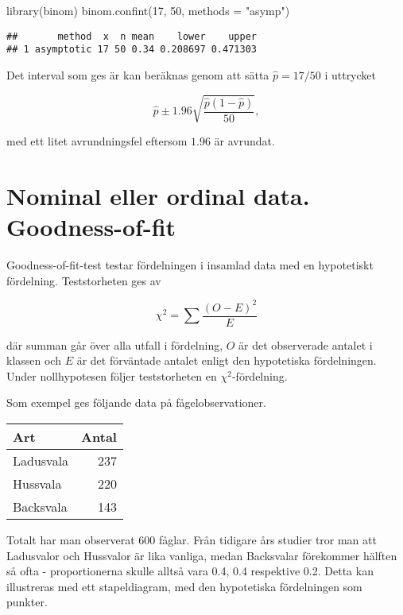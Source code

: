 \documentclass[
]{book}
\newenvironment{Shaded}{\begin{snugshade}}{\end{snugshade}}
\newcommand{\AttributeTok}[1]{\textcolor[rgb]{0.77,0.63,0.00}{#1}}
\newcommand{\DecValTok}[1]{\textcolor[rgb]{0.00,0.00,0.81}{#1}}
\newcommand{\FunctionTok}[1]{\textcolor[rgb]{0.00,0.00,0.00}{#1}}
\newcommand{\NormalTok}[1]{#1}
\newcommand{\StringTok}[1]{\textcolor[rgb]{0.31,0.60,0.02}{#1}}
\theoremstyle{definition}
\theoremstyle{definition}
\theoremstyle{definition}
\theoremstyle{definition}
\theoremstyle{remark}
\begin{document}
\begin{Shaded}
\begin{Highlighting}[]
\FunctionTok{library}\NormalTok{(binom)}
\FunctionTok{binom.confint}\NormalTok{(}\DecValTok{17}\NormalTok{, }\DecValTok{50}\NormalTok{, }\AttributeTok{methods =} \StringTok{"asymp"}\NormalTok{)}
\end{Highlighting}
\end{Shaded}

\begin{verbatim}
##       method  x  n mean    lower    upper
## 1 asymptotic 17 50 0.34 0.208697 0.471303
\end{verbatim}

Det interval som ges är kan beräknas genom att sätta \(\hat p = 17/50\) i uttrycket

\[\hat p \pm 1.96 \sqrt{\frac{\hat p (1 - \hat p)}{50}},\]

med ett litet avrundningsfel eftersom \(1.96\) är avrundat.

\hypertarget{nominal-eller-ordinal-data.-goodness-of-fit}{%
\section{Nominal eller ordinal data. Goodness-of-fit}\label{nominal-eller-ordinal-data.-goodness-of-fit}}

Goodness-of-fit-test testar fördelningen i insamlad data med en hypotetiskt fördelning. Teststorheten ges av

\[\chi^2 = \sum \frac{(O-E)^2}{E}\]

där summan går över alla utfall i fördelning, \(O\) är det observerade antalet i klassen och \(E\) är det förväntade antalet enligt den hypotetiska fördelningen. Under nollhypotesen följer teststorheten en \(\chi^2\)-fördelning.

Som exempel ges följande data på fågelobservationer.

\begin{table}
\centering
\begin{tabular}[t]{lr}
\toprule
Art & Antal\\
\midrule
Ladusvala & 237\\
Hussvala & 220\\
Backsvala & 143\\
\bottomrule
\end{tabular}
\end{table}

Totalt har man observerat 600 fåglar. Från tidigare års studier tror man att Ladusvalor och Hussvalor är lika vanliga, medan Backsvalar förekommer hälften så ofta - proportionerna skulle alltså vara 0.4, 0.4 respektive 0.2. Detta kan illustreras med ett stapeldiagram, med den hypotetiska fördelningen som punkter.
\end{document}
